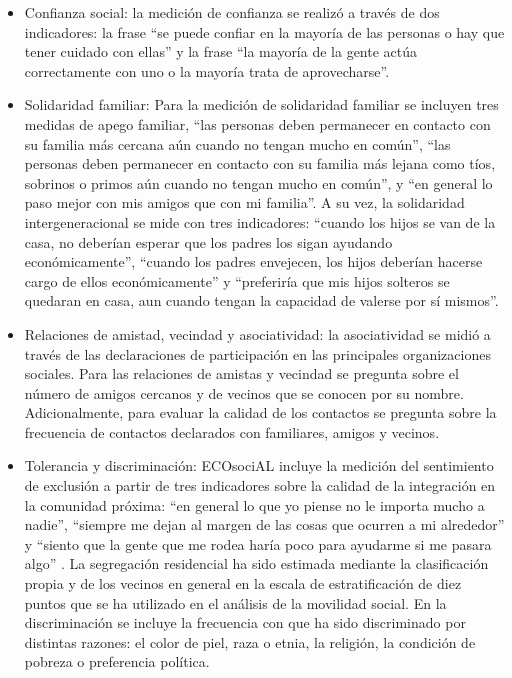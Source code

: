 \documentclass[
  12pt,
]{book}
\begin{document}
\begin{itemize}
\item
  Confianza social: la medición de confianza se realizó a través de
  dos indicadores: la frase ``se puede confiar en la mayoría de las
  personas o hay que tener cuidado con ellas'' y la frase ``la mayoría
  de la gente actúa correctamente con uno o la mayoría trata de
  aprovecharse''.
\item
  Solidaridad familiar: Para la medición de solidaridad familiar se
  incluyen tres medidas de apego familiar, ``las personas deben
  permanecer en contacto con su familia más cercana aún cuando no
  tengan mucho en común'', ``las personas deben permanecer en contacto
  con su familia más lejana como tíos, sobrinos o primos aún cuando no
  tengan mucho en común'', y ``en general lo paso mejor con mis amigos
  que con mi familia''. A su vez, la solidaridad intergeneracional se
  mide con tres indicadores: ``cuando los hijos se van de la casa, no
  deberían esperar que los padres los sigan ayudando económicamente'',
  ``cuando los padres envejecen, los hijos deberían hacerse cargo de
  ellos económicamente'' y ``preferiría que mis hijos solteros se
  quedaran en casa, aun cuando tengan la capacidad de valerse por sí
  mismos''.
\item
  Relaciones de amistad, vecindad y asociatividad: la asociatividad se
  midió a través de las declaraciones de participación en las
  principales organizaciones sociales. Para las relaciones de amistas
  y vecindad se pregunta sobre el número de amigos cercanos y de
  vecinos que se conocen por su nombre. Adicionalmente, para evaluar
  la calidad de los contactos se pregunta sobre la frecuencia de
  contactos declarados con familiares, amigos y vecinos.
\item
  Tolerancia y discriminación: ECOsociAL incluye la medición del
  sentimiento de exclusión a partir de tres indicadores sobre la
  calidad de la integración en la comunidad próxima: ``en general lo
  que yo piense no le importa mucho a nadie'', ``siempre me dejan al
  margen de las cosas que ocurren a mi alrededor'' y ``siento que la
  gente que me rodea haría poco para ayudarme si me pasara algo'' . La
  segregación residencial ha sido estimada mediante la clasificación
  propia y de los vecinos en general en la escala de estratificación
  de diez puntos que se ha utilizado en el análisis de la movilidad
  social. En la discriminación se incluye la frecuencia con que ha
  sido discriminado por distintas razones: el color de piel, raza o
  etnia, la religión, la condición de pobreza o preferencia política.

\end{itemize}
\end{document}
